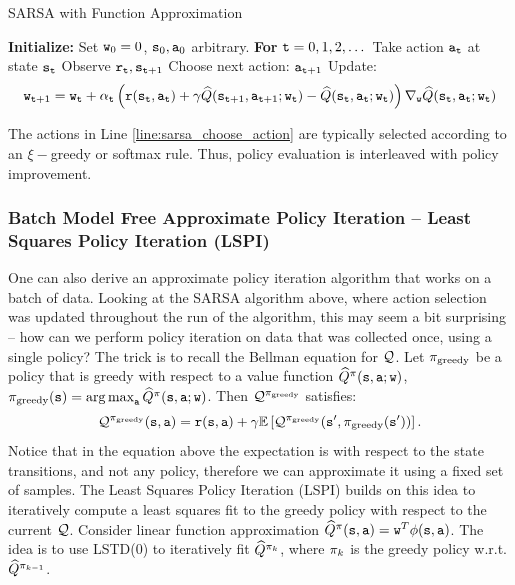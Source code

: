 \begin{algorithm}[H]
\caption{SARSA with Function Approximation}
\begin{algorithmic}[1]
\State \textbf{Initialize:} Set ${\tt w}_0 = 0$, ${\tt s}_0, {\tt a}_0$ arbitrary.
\State \textbf{For} {${\tt t} = 0, 1, 2, \dots$}
    \State \quad Take action ${\tt a}_{\tt t}$ at state ${\tt s}_{\tt t}$
    \State \quad Observe ${\tt r}_{\tt t}, {\tt s}_{{\tt t}+1}$
    \State \quad \label{line:sarsa_choose_action}Choose next action: ${\tt a}_{{\tt t}+1}$ 
    \State \quad Update:
  \[
    {\tt w}_{{\tt t}+1} = {\tt w}_{\tt t} + \alpha_{\tt t} \left( {\tt r}({\tt s}_{\tt t},{\tt a}_{\tt t}) + \gamma \widehat{Q}({\tt s}_{{\tt t}+1},{\tt a}_{{\tt t}+1};{\tt w}_{\tt t}) - \widehat{Q}({\tt s}_{{\tt t}},{\tt a}_{{\tt t}}; {\tt w}_{\tt t}) \right) \nabla_{{\tt w}} \widehat{Q}({\tt s}_{\tt t},{\tt a}_{\tt t}; {\tt w}_{\tt t})\]
\end{algorithmic}
\end{algorithm}


The actions in Line \ref{line:sarsa_choose_action} are typically selected according to an $\xi-$greedy or softmax rule. Thus, policy evaluation is interleaved with policy improvement.

\subsubsection{Batch Model Free Approximate Policy Iteration -- Least Squares Policy Iteration (LSPI)}
One can also derive an approximate policy iteration algorithm that works on a batch of data. Looking at the SARSA algorithm above, where action selection was updated throughout the run of the algorithm, this may seem a bit surprising -- how can we perform policy iteration on data that was collected once, using a single policy? The trick is to recall the Bellman equation for $\mathcal{Q}$. Let $\pi_{\textrm{greedy}}$ be a policy that is greedy with respect to a value function $\widehat{Q}^\pi({\tt s},{\tt a};{\tt w})$,  $\policy_{\textrm{greedy}}(\state) = \argmax_{\action}\widehat{Q}^\policy(\state,\action;\weight)$. Then $\mathcal{Q}^{\pi_{\textrm{greedy}}}$ satisfies:
\begin{equation*}
\mathcal{Q}^{\pi_{\textrm{greedy}}}({\tt s},{\tt a}) = {\tt r}({\tt s},{\tt a}) + \gamma \mathbb{E}\left[ \mathcal{Q}^{\pi_{\textrm{greedy}}}({\tt s}', \pi_{\textrm{greedy}}({\tt s}'))\right].
\end{equation*}
Notice that in the equation above the expectation is with respect to the state transitions, and not any policy, therefore we can approximate it using a fixed set of samples. The Least Squares Policy Iteration (LSPI) builds on this idea to iteratively compute a least squares fit to the greedy policy with respect to the current $\mathcal{Q}$.
Consider linear function approximation $\widehat{Q}^\pi({\tt s},{\tt a}) = {\tt w}^T \phi({\tt s},{\tt a})$. The idea is to use LSTD(0) to iteratively fit $\widehat{Q}^{\pi_k}$, where $\pi_k$ is the greedy policy w.r.t. $\widehat{Q}^{\pi_{k-1}}$.


